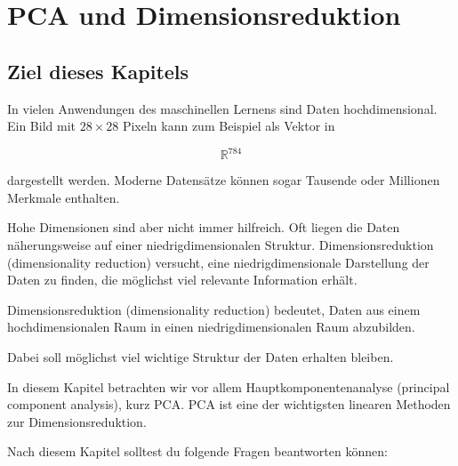 \chapter{PCA und Dimensionsreduktion}

\section{Ziel dieses Kapitels}

In vielen Anwendungen des maschinellen Lernens sind Daten hochdimensional.
Ein Bild mit \(28 \times 28\) Pixeln kann zum Beispiel als Vektor in

\[
    \mathbb{R}^{784}
\]

dargestellt werden.
Moderne Datensätze können sogar Tausende oder Millionen Merkmale enthalten.

Hohe Dimensionen sind aber nicht immer hilfreich.
Oft liegen die Daten näherungsweise auf einer niedrigdimensionalen Struktur.
Dimensionsreduktion (dimensionality reduction) versucht, eine niedrigdimensionale Darstellung der Daten zu finden, die möglichst viel relevante Information erhält.

\begin{conceptbox}
Dimensionsreduktion (dimensionality reduction) bedeutet, Daten aus einem hochdimensionalen Raum in einen niedrigdimensionalen Raum abzubilden.

Dabei soll möglichst viel wichtige Struktur der Daten erhalten bleiben.
\end{conceptbox}

In diesem Kapitel betrachten wir vor allem Hauptkomponentenanalyse (principal component analysis), kurz PCA.
PCA ist eine der wichtigsten linearen Methoden zur Dimensionsreduktion.

Nach diesem Kapitel solltest du folgende Fragen beantworten können:

